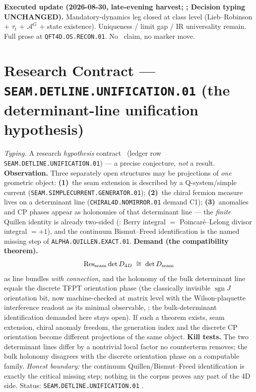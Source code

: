 \documentclass[11pt,a4paper]{article}
\begin{document}
\par\smallskip\noindent\textbf{Executed update (2026-08-30, late-evening harvest;
;
Decision typing UNCHANGED).}
Mandatory-dynamics leg closed at class level (Lieb--Robinson $+$ $\tau_t$ $+$ $\mathcal A^G$
$+$ state existence).  Uniqueness / limit gap / IR universality remain.  Full prose at
\texttt{QFT4D.OS.RECON.01}.  No \mE\ claim, no marker move.

\section*{Research Contract --- \texttt{SEAM.DETLINE.UNIFICATION.01} (the determinant-line unification hypothesis)}
\noindent\emph{Typing.} A research \emph{hypothesis} contract \mO\ (ledger row
\texttt{SEAM.DETLINE.UNIFICATION.01}) --- a precise conjecture, \emph{not} a result.
\textbf{Observation.}  Three separately open structures may be projections of \emph{one}
geometric object: \textbf{(1)}~the seam extension is described by a Q-system/simple current
(\texttt{SEAM.SIMPLECURRENT.GENERATOR.01}); \textbf{(2)}~the chiral fermion measure lives on a
determinant line (\texttt{CHIRAL4D.NOMIRROR.01} demand C1); \textbf{(3)}~anomalies and CP
phases appear as holonomies of that determinant line --- the \emph{finite} Quillen identity is
already two-sided (: Berry integral $=$
Poincar\'e--Lelong divisor integral $=+1$), and the continuum Bismut--Freed identification is
the named missing step of \texttt{ALPHA.QUILLEN.EXACT.01}.  \textbf{Demand (the compatibility
theorem).}
\[
\operatorname{Res}_{\rm seam}\det D_{4D}\;\cong\;\det D_{\rm seam}
\]
as line bundles \emph{with connection}, and the holonomy of the bulk determinant line equals
the discrete TFPT orientation phase (the classically invisible $\operatorname{sgn}J$
orientation bit, now machine-checked at matrix level with the Wilson-plaquette interference
readout as its minimal observable, ; the
bulk-determinant identification demanded here stays open).  If such a theorem exists, seam extension, chiral
anomaly freedom, the generation index and the discrete CP orientation become different
projections of the same object.  \textbf{Kill tests.}  The two determinant lines differ by a
nontrivial local factor no counterterm removes; the bulk holonomy disagrees with the discrete
orientation phase on a computable family.  \emph{Honest boundary:} the continuum
Quillen/Bismut--Freed identification is exactly the critical missing step; nothing in the
corpus proves any part of the 4D side.  Status: \texttt{SEAM.DETLINE.UNIFICATION.01} \mO.
\end{document}

